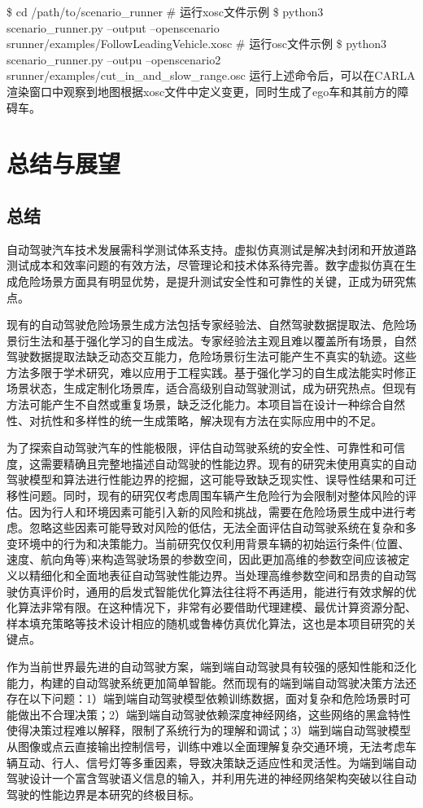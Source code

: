 \$ cd /path/to/scenario\_runner
\# 运行xosc文件示例
\$ python3 scenario\_runner.py --output --openscenario srunner/examples/FollowLeadingVehicle.xosc
\# 运行osc文件示例
\$ python3 scenario\_runner.py --outpu --openscenario2 srunner/examples/cut\_in\_and\_slow\_range.osc
运行上述命令后，可以在CARLA渲染窗口中观察到地图根据xosc文件中定义变更，同时生成了ego车和其前方的障碍车。
\newpage

\section{总结与展望}

\subsection{总结}
自动驾驶汽车技术发展需科学测试体系支持。虚拟仿真测试是解决封闭和开放道路测试成本和效率问题的有效方法，尽管理论和技术体系待完善。数字虚拟仿真在生成危险场景方面具有明显优势，是提升测试安全性和可靠性的关键，正成为研究焦点。

现有的自动驾驶危险场景生成方法包括专家经验法、自然驾驶数据提取法、危险场景衍生法和基于强化学习的自生成法。专家经验法主观且难以覆盖所有场景，自然驾驶数据提取法缺乏动态交互能力，危险场景衍生法可能产生不真实的轨迹。这些方法多限于学术研究，难以应用于工程实践。基于强化学习的自生成法能实时修正场景状态，生成定制化场景库，适合高级别自动驾驶测试，成为研究热点。但现有方法可能产生不自然或重复场景，缺乏泛化能力。本项目旨在设计一种综合自然性、对抗性和多样性的统一生成策略，解决现有方法在实际应用中的不足。

为了探索自动驾驶汽车的性能极限，评估自动驾驶系统的安全性、可靠性和可信度，这需要精确且完整地描述自动驾驶的性能边界。现有的研究未使用真实的自动驾驶模型和算法进行性能边界的挖掘，这可能导致缺乏现实性、误导性结果和可迁移性问题。同时，现有的研究仅考虑周围车辆产生危险行为会限制对整体风险的评估。因为行人和环境因素可能引入新的风险和挑战，需要在危险场景生成中进行考虑。忽略这些因素可能导致对风险的低估，无法全面评估自动驾驶系统在复杂和多变环境中的行为和决策能力。当前研究仅仅利用背景车辆的初始运行条件(位置、速度、航向角等)来构造驾驶场景的参数空间，因此更加高维的参数空间应该被定义以精细化和全面地表征自动驾驶性能边界。当处理高维参数空间和昂贵的自动驾驶仿真评价时，通用的启发式智能优化算法往往将不再适用，能进行有效求解的优化算法非常有限。在这种情况下，非常有必要借助代理建模、最优计算资源分配、样本填充策略等技术设计相应的随机或鲁棒仿真优化算法，这也是本项目研究的关键点。

作为当前世界最先进的自动驾驶方案，端到端自动驾驶具有较强的感知性能和泛化能力，构建的自动驾驶系统更加简单智能。然而现有的端到端自动驾驶决策方法还存在以下问题：1）端到端自动驾驶模型依赖训练数据，面对复杂和危险场景时可能做出不合理决策；2）端到端自动驾驶依赖深度神经网络，这些网络的黑盒特性使得决策过程难以解释，限制了系统行为的理解和调试；3）端到端自动驾驶模型从图像或点云直接输出控制信号，训练中难以全面理解复杂交通环境，无法考虑车辆互动、行人、信号灯等多重因素，导致决策缺乏适应性和灵活性。为端到端自动驾驶设计一个富含驾驶语义信息的输入，并利用先进的神经网络架构突破以往自动驾驶的性能边界是本研究的终极目标。

